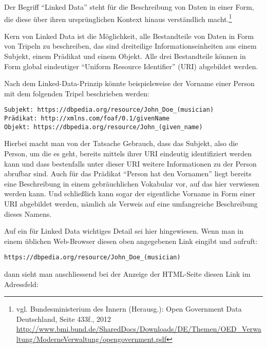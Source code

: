 \documentclass[,a4paper]{article}
\begin{document}

Der Begriff ``Linked Data'' steht für die Beschreibung von Daten in
einer Form, die diese über ihren ursprünglichen Kontext hinaus
verständlich macht.\footnote{vgl. Bundesministerium des Innern
  (Herausg.): Open Government Data Deutschland, Seite 433f., 2012
  \url{http://www.bmi.bund.de/SharedDocs/Downloads/DE/Themen/OED_Verwaltung/ModerneVerwaltung/opengovernment.pdf}}

Kern von Linked Data ist die Möglichkeit, alle Bestandteile von Daten in
Form von Tripeln zu beschreiben, das sind dreiteilige
Informationseinheiten aus einem Subjekt, einem Prädikat und einem
Objekt. Alle drei Bestandteile können in Form global eindeutiger
``Uniform Resource Identifier'' (URI) abgebildet werden.

Nach dem Linked-Data-Prinzip könnte beispielsweise der Vorname einer
Person mit dem folgenden Tripel beschrieben werden:

\begin{verbatim}
Subjekt: https://dbpedia.org/resource/John_Doe_(musician)
Prädikat: http://xmlns.com/foaf/0.1/givenName
Objekt: https://dbpedia.org/resource/John_(given_name)
\end{verbatim}

Hierbei macht man von der Tatsache Gebrauch, dass das Subjekt, also die
Person, um die es geht, bereits mittels ihrer URI eindeutig
identifiziert werden kann und dass bestenfalls unter dieser URI weitere
Informationen zu der Person abrufbar sind. Auch für das Prädikat
``Person hat den Vornamen'' liegt bereits eine Beschreibung in einem
gebräuchlichen Vokabular vor, auf das hier verwiesen werden kann. Und
schließlich kann sogar der eigentliche Vorname in Form einer URI
abgebildet werden, nämlich als Verweis auf eine umfangreiche
Beschreibung dieses Namens.

Auf ein für Linked Data wichtiges Detail sei hier hingewiesen. Wenn man
in einem üblichen Web-Browser diesen oben angegebenen Link eingibt und
aufruft:

\begin{verbatim}
https://dbpedia.org/resource/John_Doe_(musician)
\end{verbatim}

dann sieht man anschliessend bei der Anzeige der HTML-Seite diesen Link
im Adressfeld:
\end{document}
